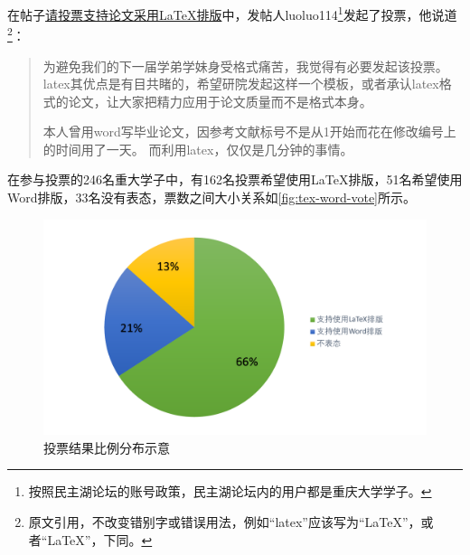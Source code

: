 在帖子\href{http://www.cqumzh.cn/bbs/forum.php?mod=viewthread&tid=830829}{请投票支持论文采用\LaTeX 排版}中，发帖人luoluo114\footnote{按照民主湖论坛的账号政策，民主湖论坛内的用户都是重庆大学学子。}发起了投票，他说道\footnote{原文引用，不改变错别字或错误用法，例如“latex”应该写为“LaTeX”，或者“\LaTeX ”，下同。}：

\begin{quotation}
	为避免我们的下一届学弟学妹身受格式痛苦，我觉得有必要发起该投票。latex其优点是有目共睹的，希望研院发起这样一个模板，或者承认latex格式的论文，让大家把精力应用于论文质量而不是格式本身。
	
	本人曾用word写毕业论文，因参考文献标号不是从1开始而花在修改编号上的时间用了一天。 而利用latex，仅仅是几分钟的事情。
\end{quotation}

在参与投票的246名重大学子中，有162名投票希望使用\LaTeX 排版，51名希望使用Word排版，33名没有表态，票数之间大小关系如\autoref{fig:tex-word-vote}所示。

\begin{figure}[tbh]
\centering
\includegraphics[width=\linewidth]{figures/TeX-Word-Vote}
\caption{投票结果比例分布示意}
\label{fig:tex-word-vote}
\end{figure}

